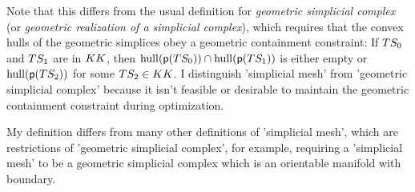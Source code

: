 Note that this differs from the usual definition for
{\it geometric simplicial complex}
(or {\it geometric realization of a simplicial complex}),
which requires that the convex hulls of the geometric
simplices obey a geometric containment constraint:
If $T{S}_0$ and $T{S}_1$ are in $K{K}$,
then $\mathrm{hull} ( \mathsf{p}( T{S}_0 ) ) \cap
\mathrm{hull} ( \mathsf{p}( T{S}_1 ) )$
is either empty or
$\mathrm{hull} ( \mathsf{p}( T{S}_2 ) )$ for some $T{S}_2 \in K{K}$.
I distinguish 'simplicial mesh' from 'geometric simplicial complex'
because it isn't feasible or desirable to maintain the geometric
containment constraint during optimization.

My definition differs from many other definitions of 'simplicial mesh',
which are restrictions of 'geometric simplicial complex', for example,
requiring a 'simplicial mesh' to be a geometric simplicial complex
which is an orientable manifold with boundary.




